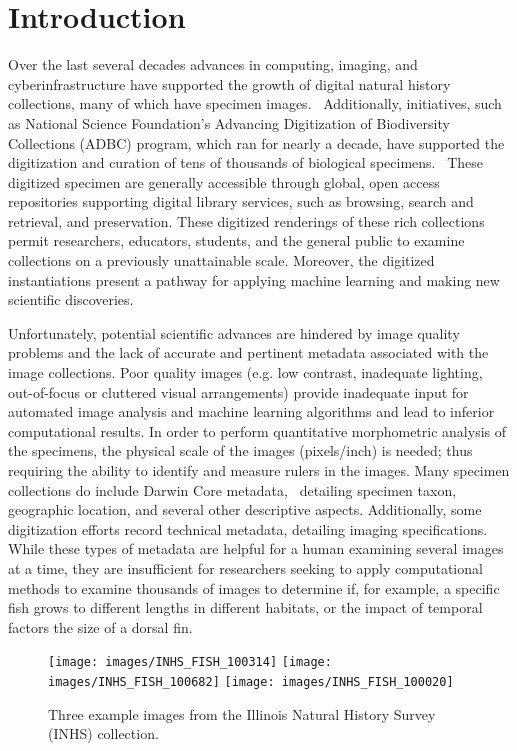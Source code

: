 \documentclass[conference]{IEEEtran}
\begin{document}
\section{Introduction}
Over the last several decades advances in computing, imaging, and cyberinfrastructure have supported the growth of digital natural history collections, many of which have specimen images.~\cite{beaman2012mass} Additionally, initiatives, such as National Science Foundation’s Advancing Digitization of Biodiversity Collections (ADBC) program, which ran for nearly a decade, have supported the digitization and curation of tens of thousands of biological specimens.~\cite{page2015digitization} These digitized specimen are generally accessible through global, open access repositories supporting digital library services, such as browsing, search and retrieval, and preservation. These digitized renderings of these rich collections permit researchers, educators, students, and the general public to examine collections on a previously unattainable scale. Moreover, the digitized instantiations present a pathway for applying machine learning and making new scientific discoveries. 

Unfortunately, potential scientific advances are hindered by image quality
problems and the lack of accurate and pertinent metadata
associated with the image collections.
Poor quality images (e.g. low contrast, inadequate lighting,
out-of-focus or cluttered visual arrangements) provide inadequate input
for automated
image analysis and machine learning algorithms and lead to inferior
computational results.
In order to perform quantitative morphometric analysis of the specimens,
the physical scale of the images (pixels/inch) is needed; thus
requiring the ability to identify and measure rulers in the images.
Many specimen collections do include Darwin Core metadata,~\cite{biodiv_info_standards} detailing
specimen taxon, geographic location, and several other descriptive aspects.
Additionally, some digitization efforts record technical metadata, detailing imaging specifications. While these types of metadata are helpful for a
human examining several images at a time, they are insufficient for researchers seeking to apply computational methods %
to examine thousands of images
to determine if, for example, a specific fish grows to different lengths
in different habitats, or the impact of temporal factors the size of a dorsal fin.
\begin{figure}
  \centering
  \texttt{[image: images/INHS\_FISH\_100314]}
  \hspace{1mm}
  \texttt{[image: images/INHS\_FISH\_100682]}
  \hspace{1mm}
  \texttt{[image: images/INHS\_FISH\_100020]}
  \caption{Three example images from the Illinois Natural History Survey (INHS) collection.}
  \label{fig:INHS_examples}
\end{figure}
\end{document}
